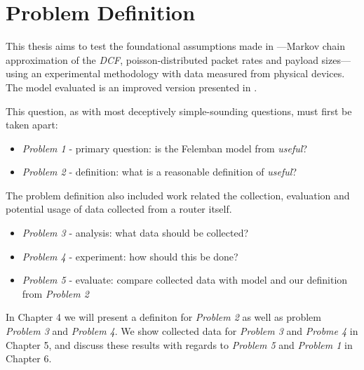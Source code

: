 \section{Problem Definition}

This thesis aims to test the foundational assumptions made in
\cite{bianchi}—Markov chain approximation of the \emph{DCF},
poisson-distributed packet rates and payload sizes—using an experimental
methodology with data measured from physical devices. The model evaluated is
an improved version presented in \cite{felemban}.

This question, as with most deceptively simple-sounding questions, must first
be taken apart:

\begin{itemize}
\item \emph{Problem 1} - primary question: is the Felemban model from \cite{felemban} \emph{useful}?
\item \emph{Problem 2} - definition: what is a reasonable definition of \emph{useful}?
\end{itemize}

The problem definition also included work related the collection, evaluation
and potential usage of data collected from a router itself.

\begin{itemize}
\item \emph{Problem 3} - analysis: what data should be collected?
\item \emph{Problem 4} - experiment: how should this be done?
\item \emph{Problem 5} - evaluate: compare collected data with model and our definition from \emph{Problem 2}
\end{itemize}

In Chapter 4 we will present a definiton for \emph{Problem 2} as well as
problem \emph{Problem 3} and \emph{Problem 4}. We show collected data for
\emph{Problem 3} and \emph{Probme 4} in Chapter 5, and discuss these results
with regards to \emph{Problem 5} and \emph{Problem 1} in Chapter 6.

